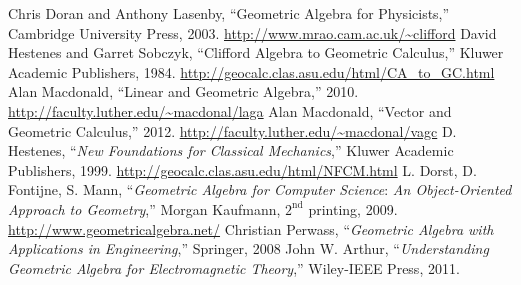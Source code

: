\documentclass[12pt]{report}
\begin{document}
\begin{thebibliography}{99}
 Chris Doran and Anthony Lasenby, ``Geometric Algebra for Physicists,'' Cambridge University
Press, 2003. \url{http://www.mrao.cam.ac.uk/~clifford}
 David Hestenes and Garret Sobczyk, ``Clifford Algebra to Geometric Calculus,'' Kluwer Academic
Publishers, 1984. \url{http://geocalc.clas.asu.edu/html/CA_to_GC.html}
 Alan Macdonald, ``Linear and Geometric Algebra,'' 2010. \url{http://faculty.luther.edu/~macdonal/laga}
 Alan Macdonald, ``Vector and Geometric Calculus,'' 2012. \url{http://faculty.luther.edu/~macdonal/vagc}
 D. Hestenes, ``\emph{New Foundations for Classical Mechanics},'' Kluwer Academic Publishers, 1999. \url{http://geocalc.clas.asu.edu/html/NFCM.html}
 L. Dorst, D. Fontijne, S. Mann, ``\emph{Geometric Algebra for Computer Science}:
\emph{An Object-Oriented Approach to Geometry},'' Morgan Kaufmann, $2^{\text{nd}}$ printing, 2009.
\url{http://www.geometricalgebra.net/}
 Christian Perwass, ``\emph{Geometric Algebra with Applications in Engineering},'' Springer, 2008
 John W. Arthur, ``\emph{Understanding Geometric Algebra for Electromagnetic Theory},'' Wiley-IEEE Press, 2011.
\end{thebibliography}
\end{document}
